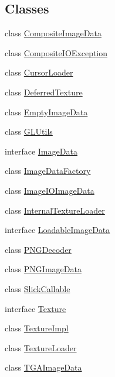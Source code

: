 \subsection*{Classes}
\begin{DoxyCompactItemize}
\item 
class \mbox{\hyperlink{classorg_1_1newdawn_1_1slick_1_1opengl_1_1_composite_image_data}{Composite\+Image\+Data}}
\item 
class \mbox{\hyperlink{classorg_1_1newdawn_1_1slick_1_1opengl_1_1_composite_i_o_exception}{Composite\+I\+O\+Exception}}
\item 
class \mbox{\hyperlink{classorg_1_1newdawn_1_1slick_1_1opengl_1_1_cursor_loader}{Cursor\+Loader}}
\item 
class \mbox{\hyperlink{classorg_1_1newdawn_1_1slick_1_1opengl_1_1_deferred_texture}{Deferred\+Texture}}
\item 
class \mbox{\hyperlink{classorg_1_1newdawn_1_1slick_1_1opengl_1_1_empty_image_data}{Empty\+Image\+Data}}
\item 
class \mbox{\hyperlink{classorg_1_1newdawn_1_1slick_1_1opengl_1_1_g_l_utils}{G\+L\+Utils}}
\item 
interface \mbox{\hyperlink{interfaceorg_1_1newdawn_1_1slick_1_1opengl_1_1_image_data}{Image\+Data}}
\item 
class \mbox{\hyperlink{classorg_1_1newdawn_1_1slick_1_1opengl_1_1_image_data_factory}{Image\+Data\+Factory}}
\item 
class \mbox{\hyperlink{classorg_1_1newdawn_1_1slick_1_1opengl_1_1_image_i_o_image_data}{Image\+I\+O\+Image\+Data}}
\item 
class \mbox{\hyperlink{classorg_1_1newdawn_1_1slick_1_1opengl_1_1_internal_texture_loader}{Internal\+Texture\+Loader}}
\item 
interface \mbox{\hyperlink{interfaceorg_1_1newdawn_1_1slick_1_1opengl_1_1_loadable_image_data}{Loadable\+Image\+Data}}
\item 
class \mbox{\hyperlink{classorg_1_1newdawn_1_1slick_1_1opengl_1_1_p_n_g_decoder}{P\+N\+G\+Decoder}}
\item 
class \mbox{\hyperlink{classorg_1_1newdawn_1_1slick_1_1opengl_1_1_p_n_g_image_data}{P\+N\+G\+Image\+Data}}
\item 
class \mbox{\hyperlink{classorg_1_1newdawn_1_1slick_1_1opengl_1_1_slick_callable}{Slick\+Callable}}
\item 
interface \mbox{\hyperlink{interfaceorg_1_1newdawn_1_1slick_1_1opengl_1_1_texture}{Texture}}
\item 
class \mbox{\hyperlink{classorg_1_1newdawn_1_1slick_1_1opengl_1_1_texture_impl}{Texture\+Impl}}
\item 
class \mbox{\hyperlink{classorg_1_1newdawn_1_1slick_1_1opengl_1_1_texture_loader}{Texture\+Loader}}
\item 
class \mbox{\hyperlink{classorg_1_1newdawn_1_1slick_1_1opengl_1_1_t_g_a_image_data}{T\+G\+A\+Image\+Data}}
\end{DoxyCompactItemize}
